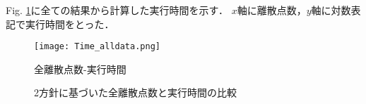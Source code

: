 \documentclass[12pt,a4paper]{jsarticle}
\begin{document}
Fig. \ref{fig:ExecutionTime_alldata}に全ての結果から計算した実行時間を示す．
$x$軸に離散点数，$y$軸に対数表記で実行時間をとった．
\begin{figure}[h]
  \centering
  \texttt{[image: Time\_alldata.png]}
  \caption{全離散点数-実行時間}
  \label{fig:ExecutionTime_alldata}
\end{figure}
\begin{figure}[h]
  \centering
    \caption{2方針に基づいた全離散点数と実行時間の比較}
\end{figure}
\end{document}
